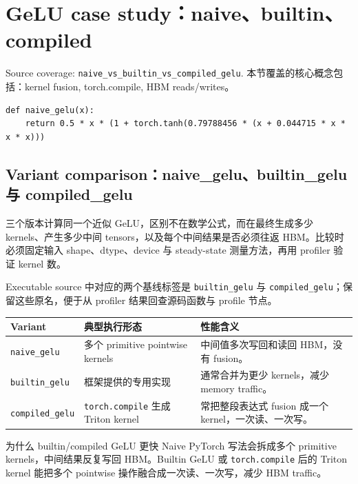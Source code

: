 \section{GeLU case study：naive、builtin、compiled}

Source coverage: \texttt{naive\_vs\_builtin\_vs\_compiled\_gelu}. 本节覆盖的核心概念包括：kernel fusion, torch.compile, HBM reads/writes。


\begin{lstlisting}[caption={naive GeLU 的问题：多个小操作导致多次 HBM 往返}]
def naive_gelu(x):
    return 0.5 * x * (1 + torch.tanh(0.79788456 * (x + 0.044715 * x * x * x)))
\end{lstlisting}

\subsection{Variant comparison：naive\_gelu、builtin\_gelu 与 compiled\_gelu}

三个版本计算同一个近似 GeLU，区别不在数学公式，而在最终生成多少 kernels、产生多少中间 tensors，以及每个中间结果是否必须往返 HBM。比较时必须固定输入 shape、dtype、device 与 steady-state 测量方法，再用 profiler 验证 kernel 数。

Executable source 中对应的两个基线标签是 \verb|builtin_gelu| 与 \verb|compiled_gelu|；保留这些原名，便于从 profiler 结果回查源码函数与 profile 节点。

\begin{longtable}{p{}p{}p{}}
\toprule
\textbf{Variant} & \textbf{典型执行形态} & \textbf{性能含义} \\
\midrule
\texttt{naive\_gelu} & 多个 primitive pointwise kernels & 中间值多次写回和读回 HBM，没有 fusion。 \\
\texttt{builtin\_gelu} & 框架提供的专用实现 & 通常合并为更少 kernels，减少 memory traffic。 \\
\texttt{compiled\_gelu} & \texttt{torch.compile} 生成 Triton kernel & 常把整段表达式 fusion 成一个 kernel，一次读、一次写。 \\
\bottomrule
\end{longtable}
\begin{importantbox}{为什么 builtin/compiled GeLU 更快}
Naive PyTorch 写法会拆成多个 primitive kernels，中间结果反复写回 HBM。Builtin GeLU 或 \texttt{torch.compile} 后的 Triton kernel 能把多个 pointwise 操作融合成一次读、一次写，减少 HBM traffic。
\end{importantbox}

